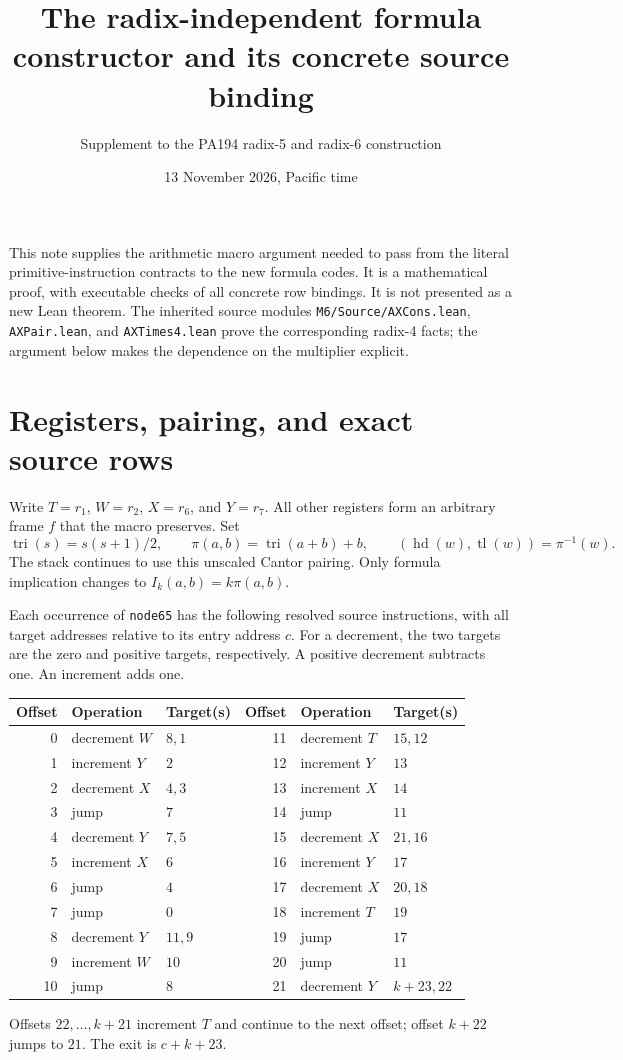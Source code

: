 \documentclass[11pt]{article}
\title{The radix-independent formula constructor and its concrete source binding}
\author{Supplement to the PA194 radix-5 and radix-6 construction}
\date{13 November 2026, Pacific time}
\newcommand{\pair}[2]{\pi(#1,#2)}
\newcommand{\tri}{\operatorname{tri}}
\begin{document}
\maketitle

This note supplies the arithmetic macro argument needed to pass from the
literal primitive-instruction contracts to the new formula codes.  It is
a mathematical proof, with executable checks of all concrete row bindings.
It is not presented as a new Lean theorem.  The inherited source modules
\texttt{M6/Source/AXCons.lean}, \texttt{AXPair.lean}, and
\texttt{AXTimes4.lean} prove the corresponding radix-4 facts; the argument
below makes the dependence on the multiplier explicit.

\section{Registers, pairing, and exact source rows}

Write $T=r_1$, $W=r_2$, $X=r_6$, and $Y=r_7$.  All other registers form an
arbitrary frame $f$ that the macro preserves.  Set
\[
 \tri(s)=s(s+1)/2,\qquad \pair ab=\tri(a+b)+b,
 \qquad (\operatorname{hd}(w),\operatorname{tl}(w))=\pi^{-1}(w).
\]
The stack continues to use this unscaled Cantor pairing.  Only formula
implication changes to $I_k(a,b)=k\pair ab$.

Each occurrence of \texttt{node65} has the following resolved source
instructions, with all target addresses relative to its entry address $c$.
For a decrement, the two targets are the zero and positive targets,
respectively.  A positive decrement subtracts one.  An increment adds one.

\begin{center}
\begin{tabular}{rll@{\qquad}rll}
\toprule
Offset & Operation & Target(s) & Offset & Operation & Target(s)\\
\midrule
0 & decrement $W$ & $8,1$ & 11 & decrement $T$ & $15,12$\\
1 & increment $Y$ & $2$ & 12 & increment $Y$ & $13$\\
2 & decrement $X$ & $4,3$ & 13 & increment $X$ & $14$\\
3 & jump & $7$ & 14 & jump & $11$\\
4 & decrement $Y$ & $7,5$ & 15 & decrement $X$ & $21,16$\\
5 & increment $X$ & $6$ & 16 & increment $Y$ & $17$\\
6 & jump & $4$ & 17 & decrement $X$ & $20,18$\\
7 & jump & $0$ & 18 & increment $T$ & $19$\\
8 & decrement $Y$ & $11,9$ & 19 & jump & $17$\\
9 & increment $W$ & $10$ & 20 & jump & $11$\\
10 & jump & $8$ & 21 & decrement $Y$ & $k+23,22$\\
\bottomrule
\end{tabular}
\end{center}
Offsets $22,\ldots,k+21$ increment $T$ and continue to the next offset;
offset $k+22$ jumps to $21$.  The exit is $c+k+23$.
\end{document}
